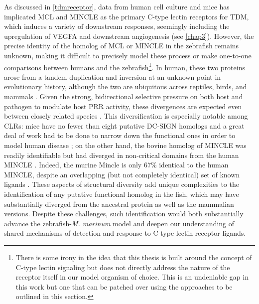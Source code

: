 As discussed in \autoref{tdmreceptor}, data from human cell culture and mice has implicated MCL and MINCLE as the primary C\hyp{}type lectin receptors for TDM, which induces a variety of downstream responses, seemingly including the upregulation of VEGFA and downstream angiogenesis (see \autoref{chap3}). However, the precise identity of the homolog of MCL or MINCLE in the zebrafish remains unknown, making it difficult to precisely model these process or make one\hyp{}to\hyp{}one comparisons between humans and the zebrafish\footnote{There is some irony in the idea that this thesis is built around the concept of C-type lectin signaling but does not directly address the nature of the receptor itself in our model organism of choice. This is an undeniable gap in this work but one that can be patched over using the approaches to be outlined in this section.}. In human, these two proteins arose from a tandem duplication and inversion at an unknown point in evolutionary history, although the two are ubiquitous across reptiles, birds, and mammals \citep{Miyake2013, Richardson2014}. Given the strong, bidirectional selective pressure on both host and pathogen to modulate host PRR activity, these divergences are expected even between closely related species \citep{Rambaruth2015}. This diversification is especially notable among CLRs: mice have no fewer than eight putative DC\hyp{}SIGN homologs and a great deal of work had to be done to narrow down the functional ones in order to model human disease \citep{GarciaVallejo2013}; on the other hand, the bovine homolog of MINCLE was readily identifiable but had diverged in non\hyp{}critical domains from the human MINCLE \citep{Feinberg2016, Furukawa2013, Feinberg2013}. Indeed, the murine Mincle is only 67\% identical to the human MINCLE, despite an overlapping (but not completely identical) set of known ligands \citep{Matsumoto1999}. These aspects of structural diversity add unique complexities to the identification of any putative functional homolog in the fish, which may have substantially diverged from the ancestral protein as well as the mammalian versions. Despite these challenges, such identification would both substantially advance the zebrafish\hyp{}\textit{M. marinum} model and deepen our understanding of shared mechanisms of detection and response to C\hyp{}type lectin receptor ligands.

